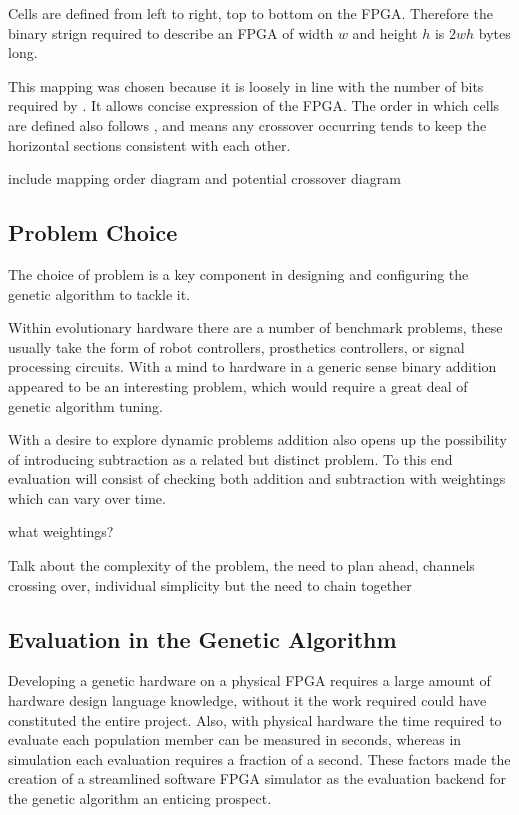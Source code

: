 Cells are defined from left to right, top to bottom on the FPGA. Therefore the
binary strign required to describe an FPGA of width $w$ and height $h$ is $2wh$
bytes long.

This mapping was chosen because it is loosely in line with the number of bits
required by \cite{10.1007/3-540-63173-9_61}. It allows concise expression of
the FPGA. The order in which cells are defined also follows
\cite{10.1007/3-540-63173-9_61}, and means any crossover occurring tends to keep
the horizontal sections consistent with each other.

\todo include mapping order diagram and potential crossover diagram

\subsection{Problem Choice}

The choice of problem is a key component in designing and configuring the genetic
algorithm to tackle it.

Within evolutionary hardware there are a number of benchmark problems, these usually
take the form of robot controllers, prosthetics controllers, or signal processing
circuits. With a mind to hardware in a generic sense binary addition appeared to be
an interesting problem, which would require a great deal of genetic algorithm tuning.

With a desire to explore dynamic problems addition also opens up the possibility of
introducing subtraction as a related but distinct problem. To this end evaluation
will consist of checking both addition and subtraction with weightings which can
vary over time.

\todo what weightings?

\todo Talk about the complexity of the problem, the need to plan ahead, channels crossing over,
individual simplicity but the need to chain together

\subsection{Evaluation in the Genetic Algorithm}

Developing a genetic hardware on a physical FPGA requires a large amount of hardware
design language knowledge, without it the work required could have constituted the
entire project. Also, with physical hardware the time required to evaluate each
population member can be measured in seconds, whereas in simulation each evaluation
requires a fraction of a second. These factors made the creation of a
streamlined software FPGA simulator as the evaluation backend for the
genetic algorithm an enticing prospect.


